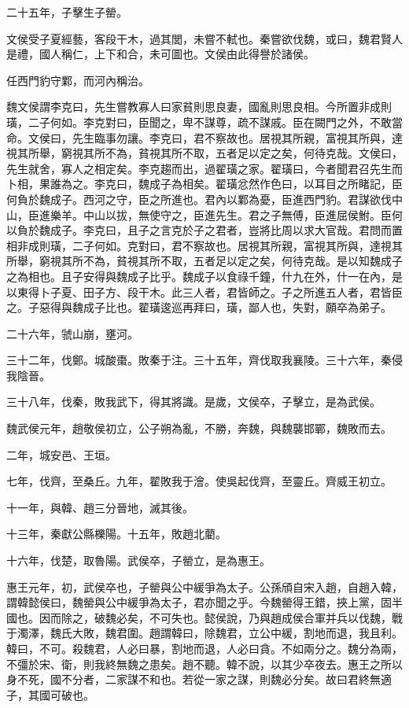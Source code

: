二十五年，子擊生子罃。

文侯受子夏經藝，客段干木，過其閭，未嘗不軾也。秦嘗欲伐魏，或曰，魏君賢人是禮，國人稱仁，上下和合，未可圖也。文侯由此得譽於諸侯。

任西門豹守鄴，而河內稱治。

魏文侯謂李克曰，先生嘗教寡人曰家貧則思良妻，國亂則思良相。今所置非成則璜，二子何如。李克對曰，臣聞之，卑不謀尊，疏不謀戚。臣在闕門之外，不敢當命。文侯曰，先生臨事勿讓。李克曰，君不察故也。居視其所親，富視其所與，達視其所舉，窮視其所不為，貧視其所不取，五者足以定之矣，何待克哉。文侯曰，先生就舍，寡人之相定矣。李克趨而出，過翟璜之家。翟璜曰，今者聞君召先生而卜相，果誰為之。李克曰，魏成子為相矣。翟璜忿然作色曰，以耳目之所睹記，臣何負於魏成子。西河之守，臣之所進也。君內以鄴為憂，臣進西門豹。君謀欲伐中山，臣進樂羊。中山以拔，無使守之，臣進先生。君之子無傅，臣進屈侯鮒。臣何以負於魏成子。李克曰，且子之言克於子之君者，豈將比周以求大官哉。君問而置相非成則璜，二子何如。克對曰，君不察故也。居視其所親，富視其所與，達視其所舉，窮視其所不為，貧視其所不取，五者足以定之矣，何待克哉。是以知魏成子之為相也。且子安得與魏成子比乎。魏成子以食祿千鐘，什九在外，什一在內，是以東得卜子夏、田子方、段干木。此三人者，君皆師之。子之所進五人者，君皆臣之。子惡得與魏成子比也。翟璜逡巡再拜曰，璜，鄙人也，失對，願卒為弟子。

二十六年，虢山崩，壅河。

三十二年，伐鄭。城酸棗。敗秦于注。三十五年，齊伐取我襄陵。三十六年，秦侵我陰晉。

三十八年，伐秦，敗我武下，得其將識。是歲，文侯卒，子擊立，是為武侯。

魏武侯元年，趙敬侯初立，公子朔為亂，不勝，奔魏，與魏襲邯鄲，魏敗而去。

二年，城安邑、王垣。

七年，伐齊，至桑丘。九年，翟敗我于澮。使吳起伐齊，至靈丘。齊威王初立。

十一年，與韓、趙三分晉地，滅其後。

十三年，秦獻公縣櫟陽。十五年，敗趙北藺。

十六年，伐楚，取魯陽。武侯卒，子罃立，是為惠王。

惠王元年，初，武侯卒也，子罃與公中緩爭為太子。公孫頎自宋入趙，自趙入韓，謂韓懿侯曰，魏罃與公中緩爭為太子，君亦聞之乎。今魏罃得王錯，挾上黨，固半國也。因而除之，破魏必矣，不可失也。懿侯說，乃與趙成侯合軍并兵以伐魏，戰于濁澤，魏氏大敗，魏君圍。趙謂韓曰，除魏君，立公中緩，割地而退，我且利。韓曰，不可。殺魏君，人必曰暴，割地而退，人必曰貪。不如兩分之。魏分為兩，不彊於宋、衛，則我終無魏之患矣。趙不聽。韓不說，以其少卒夜去。惠王之所以身不死，國不分者，二家謀不和也。若從一家之謀，則魏必分矣。故曰君終無適子，其國可破也。

